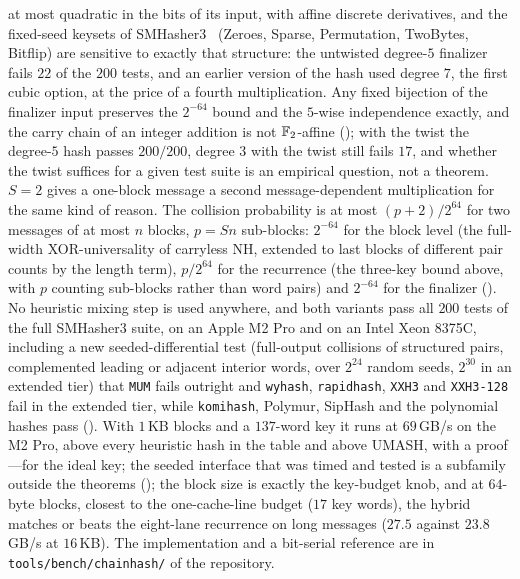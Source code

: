 at most quadratic in the bits of its input, with affine discrete derivatives, and the
fixed-seed keysets of SMHasher3~\cite{smhasher3} (Zeroes, Sparse,
Permutation, TwoBytes, Bitflip) are sensitive to exactly that structure: the
untwisted degree-$5$ finalizer fails $22$ of the $200$ tests, and an earlier
version of the hash used degree $7$, the first cubic option, at the price of
a fourth multiplication.  Any fixed bijection of the finalizer input
preserves the $2^{-64}$ bound and the $5$-wise independence exactly, and the
carry chain of an integer addition is not $\mathbb{F}_2$-affine
(); with the twist the degree-$5$ hash passes $200/200$,
degree $3$ with the twist still fails $17$, and whether the twist suffices
for a given test suite is an empirical question, not a theorem.  $S=2$
gives a one-block message a second message-dependent multiplication for the
same kind of reason.  The collision probability is at most $(p+2)/2^{64}$ for two
messages of at most $n$ blocks, $p=Sn$ sub-blocks: $2^{-64}$ for the block
level (the full-width XOR-universality of carryless NH, extended to last
blocks of different pair counts by the length term), $p/2^{64}$ for the
recurrence (the three-key bound above, with $p$ counting sub-blocks rather
than word pairs) and $2^{-64}$ for the finalizer ().  No
heuristic mixing step is used anywhere, and both variants pass all $200$
tests of the full SMHasher3 suite, on an Apple M2 Pro and on an Intel Xeon
8375C, including a new seeded-differential test
(full-output collisions of structured pairs, complemented leading or adjacent
interior words, over $2^{24}$ random seeds, $2^{30}$ in an extended tier) that
\texttt{MUM} fails outright and \texttt{wyhash}, \texttt{rapidhash},
\texttt{XXH3} and \texttt{XXH3-128} fail in the extended tier, while \texttt{komihash},
Polymur, SipHash and the polynomial hashes pass ().
With $1$\,KB blocks and a $137$-word key it runs at $69$\,GB/s on the M2 Pro,
above every heuristic hash in the table and above UMASH, with a proof---for
the ideal key; the seeded interface that was timed and tested is a subfamily
outside the theorems (); the
block size is exactly the key-budget knob, and at $64$-byte blocks, closest to
the one-cache-line budget ($17$ key words), the hybrid matches or beats the
eight-lane recurrence on long messages ($27.5$ against $23.8$\,GB/s at
$16$\,KB).  The implementation and a
bit-serial reference are in \texttt{tools/bench/chainhash/} of the repository.

